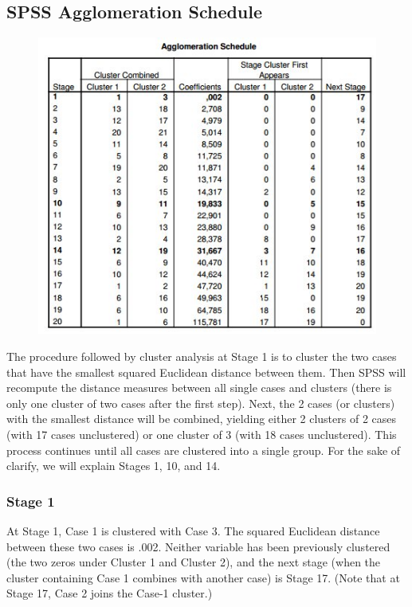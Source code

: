 \documentclass[a4paper,12pt]{article}
\begin{document}
\newpage
\subsection{SPSS Agglomeration Schedule}
\begin{center}
	\begin{figure}
		\includegraphics[scale=1.1]{images/AggloSc}\\
	\end{figure}
\end{center}


The procedure followed by cluster analysis at Stage 1 is to cluster the two cases that have the smallest
squared Euclidean distance between them. Then SPSS will recompute the distance measures between all
single cases and clusters (there is only one cluster of two cases after the first step). Next, the 2 cases (or
clusters) with the smallest distance will be combined, yielding either 2 clusters of 2 cases (with 17 cases
unclustered) or one cluster of 3 (with 18 cases unclustered).  This process continues until all cases are clustered into a single group.
For the sake of clarify, we will explain Stages 1, 10, and 14.


\subsubsection{Stage 1}
At Stage 1, Case 1 is clustered with Case 3. The squared Euclidean distance between these two cases is
.002. Neither variable has been previously clustered (the two zeros under Cluster 1 and Cluster 2), and the
next stage (when the cluster containing Case 1 combines with another case) is Stage 17. (Note that at Stage
17, Case 2 joins the Case-1 cluster.)
\end{document}
